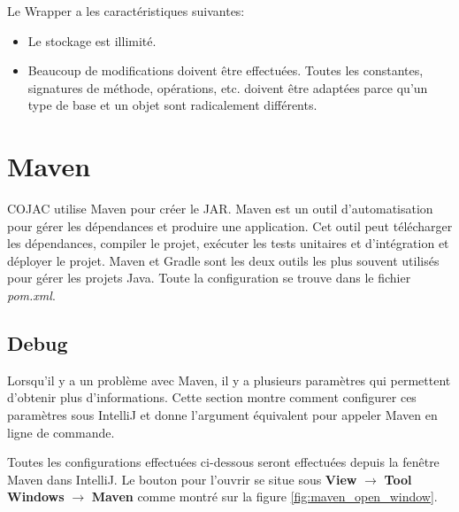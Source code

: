 Le Wrapper a les caractéristiques suivantes:
\begin{itemize}
    \item Le stockage est illimité.
    \item Beaucoup de modifications doivent être effectuées. Toutes les constantes, signatures de méthode, opérations, etc. doivent être adaptées parce qu'un type de base et un objet sont radicalement différents.
\end{itemize}

\section{Maven}

COJAC \cite{COJAC} utilise Maven \cite{maven} pour créer le JAR. Maven \cite{maven} est un outil d'automatisation pour gérer les dépendances et produire une application. Cet outil peut télécharger les dépendances, compiler le projet, exécuter les tests unitaires et d'intégration et déployer le projet. Maven et Gradle sont les deux outils les plus souvent utilisés pour gérer les projets Java. Toute la configuration se trouve dans le fichier \textit{pom.xml}.

\subsection{Debug}

Lorsqu'il y a un problème avec Maven, il y a plusieurs paramètres qui permettent d'obtenir plus d'informations. Cette section montre comment configurer ces paramètres sous IntelliJ et donne l'argument équivalent pour appeler Maven en ligne de commande.

\begin{minipage2}
\subtitle{Ouvrir la fenêtre Maven}

Toutes les configurations effectuées ci-dessous seront effectuées depuis la fenêtre Maven dans IntelliJ. Le bouton pour l'ouvrir se situe sous \textbf{View} $\rightarrow$ \textbf{Tool Windows} $\rightarrow$ \textbf{Maven} comme montré sur la figure \ref{fig:maven_open_window}.
\end{minipage2}

\begin{minipage}{\linewidth}%
\label{fig:maven_open_window}
\end{minipage}

